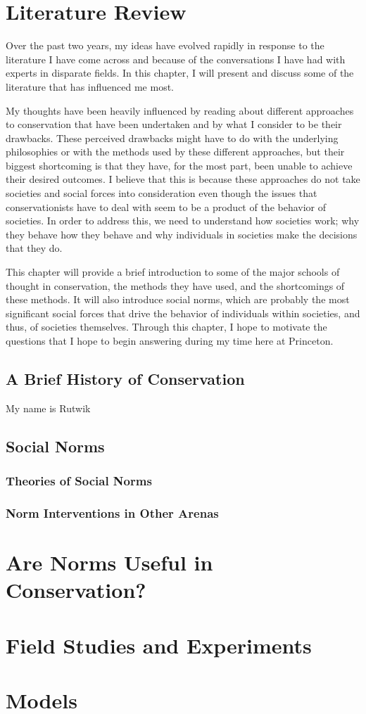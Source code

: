 \documentclass[rutwik_proposal.tex]{subfiles}
\begin{document}
\chapter{Literature Review}\label{ch:litrev}

Over the past two years, my ideas have evolved rapidly in response to the literature I have come across and because of the conversations I have had with experts in disparate fields. In this chapter, I will present and discuss some of the literature that has influenced me most.

My thoughts have been heavily influenced by reading about different approaches to conservation that have been undertaken and by what I consider to be their drawbacks. These perceived drawbacks might have to do with the underlying philosophies or with the methods used by these different approaches, but their biggest shortcoming is that they have, for the most part, been unable to achieve their desired outcomes. I believe that this is because these approaches do not take societies and social forces into consideration even though the issues that conservationists have to deal with seem to be a product of the behavior of societies. In order to address this, we need to understand how societies work; why they behave how they behave and why individuals in societies make the decisions that they do.

This chapter will provide a brief introduction to some of the major schools of thought in conservation, the methods they have used, and the shortcomings of these methods. It will also introduce social norms, which are probably the most significant social forces that drive the behavior of individuals within societies, and thus, of societies themselves. Through this chapter, I hope to motivate the questions that I hope to begin answering during my time here at Princeton.

\section{A Brief History of Conservation}\label{sec:history}
My name is Rutwik

\section{Social Norms}\label{sec:norms}
\subsection{Theories of Social Norms}\label{subsec:theories}
\subsection{Norm Interventions in Other Arenas}\label{subsec:interventions}

\chapter{Are Norms Useful in Conservation?}\label{ch:usefulness}

\chapter{Field Studies and Experiments}\label{ch:field}

\chapter{Models}\label{ch:models}
\end{document}
